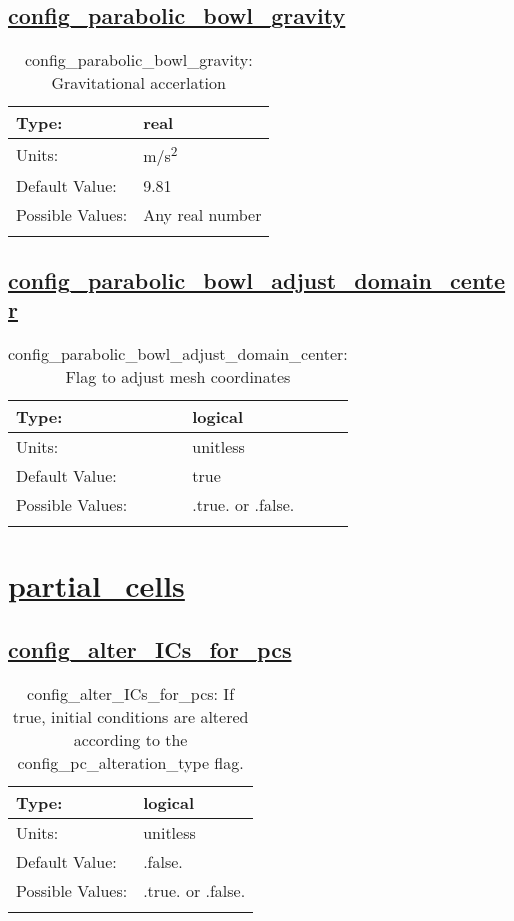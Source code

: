 \subsection[config\_parabolic\_bowl\_gravity]{\hyperref[sec:nm_tab_parabolic_bowl]{config\_parabolic\_bowl\_gravity}}
\label{subsec:nm_sec_config_parabolic_bowl_gravity}
\begin{center}
\begin{longtable}{| p{2.0in} || p{4.0in} |}
    \hline
    Type: & real \\
    \hline
    Units: & \si{m/s^2} \\
    \hline
    Default Value: & 9.81 \\
    \hline
    Possible Values: & Any real number \\
    \hline
    \caption{config\_parabolic\_bowl\_gravity: Gravitational accerlation}
\end{longtable}
\end{center}
\subsection[config\_parabolic\_bowl\_adjust\_domain\_center]{\hyperref[sec:nm_tab_parabolic_bowl]{config\_parabolic\_bowl\_adjust\_domain\_center}}
\label{subsec:nm_sec_config_parabolic_bowl_adjust_domain_center}
\begin{center}
\begin{longtable}{| p{2.0in} || p{4.0in} |}
    \hline
    Type: & logical \\
    \hline
    Units: & \si{unitless} \\
    \hline
    Default Value: & true \\
    \hline
    Possible Values: & .true. or .false. \\
    \hline
    \caption{config\_parabolic\_bowl\_adjust\_domain\_center: Flag to adjust mesh coordinates}
\end{longtable}
\end{center}
\section[partial\_cells]{\hyperref[sec:nm_tab_partial_cells]{partial\_cells}}
\label{sec:nm_sec_partial_cells}
\subsection[config\_alter\_ICs\_for\_pcs]{\hyperref[sec:nm_tab_partial_cells]{config\_alter\_ICs\_for\_pcs}}
\label{subsec:nm_sec_config_alter_ICs_for_pcs}
\begin{center}
\begin{longtable}{| p{2.0in} || p{4.0in} |}
    \hline
    Type: & logical \\
    \hline
    Units: & \si{unitless} \\
    \hline
    Default Value: & .false. \\
    \hline
    Possible Values: & .true. or .false. \\
    \hline
    \caption{config\_alter\_ICs\_for\_pcs: If true, initial conditions are altered according to the config\_pc\_alteration\_type flag.}
\end{longtable}
\end{center}
